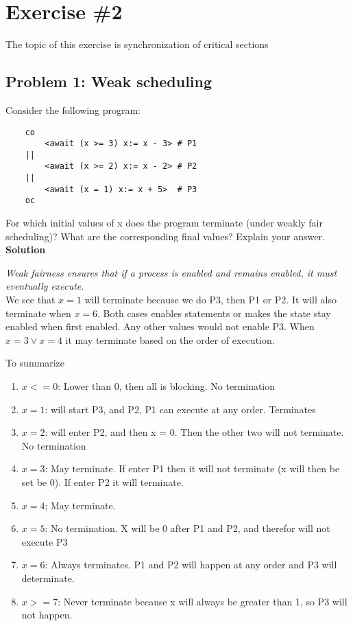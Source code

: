 \section{Exercise \#2}

The topic of this exercise is synchronization of critical sections 

\subsection{Problem 1: Weak scheduling}

Consider the following program:

\begin{lstlisting}
    co
        <await (x >= 3) x:= x - 3> # P1
    ||
        <await (x >= 2) x:= x - 2> # P2
    ||
        <await (x = 1) x:= x + 5>  # P3
    oc
\end{lstlisting}


For which initial values of x does the program terminate (under weakly fair scheduling)?
What are the corresponding final values? Explain your answer. \\

\textbf{Solution}

\textit{Weak fairness ensures that if a process is enabled and remains enabled, it must eventually execute.} \\

We see that $x=1$ will terminate because we do P3, then P1 or P2. It will also terminate when $x=6$.
Both cases enables statements or makes the state stay enabled when first enabled. Any other values would not enable
P3. When $x=3 \lor x=4$ it may terminate based on the order of execution. 

To summarize

\begin{enumerate}
    \item $x <= 0$: Lower than 0, then all is blocking. No termination 
    \item $x = 1$: will start P3, and P2, P1 can execute at any order. Terminates 
    \item $x = 2$: will enter P2, and then x = 0. Then the other two will not terminate. No termination
    \item $x = 3$: May terminate. If enter P1 then it will not terminate (x will then be set be 0). If enter P2 it will terminate.
    \item $x = 4$; May terminate. 
    \item $x = 5$: No termination. X will be 0 after P1 and P2, and therefor will not execute P3
    \item $x = 6$: Always terminates. P1 and P2 will happen at any order and P3 will determinate. 
    \item $x >= 7$: Never terminate because x will always be greater than 1, so P3 will not happen. 
\end{enumerate}


